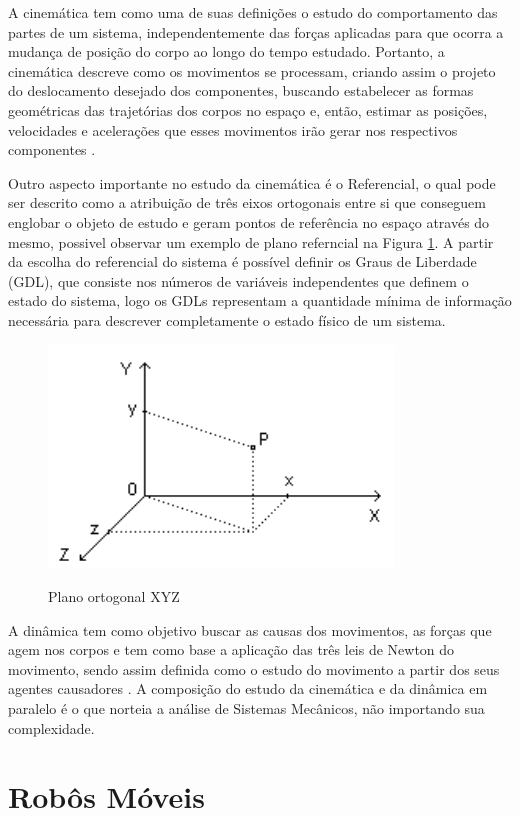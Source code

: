 \documentclass[deposito, acronym, symbols]{fei}
\begin{document}
A cinemática tem como uma de suas definições o estudo do comportamento das partes de um sistema, independentemente das forças aplicadas para que ocorra a mudança de posição do corpo ao longo do tempo estudado. Portanto, a cinemática descreve como os movimentos se processam, criando assim o projeto do deslocamento desejado dos componentes, buscando estabelecer as formas geométricas das trajetórias dos corpos no espaço e, então, estimar as posições, velocidades e acelerações que esses movimentos irão gerar nos respectivos componentes \cite{norton2010cinematica}. 

Outro aspecto importante no estudo da cinemática é o Referencial, o qual pode ser descrito como a atribuição de três eixos ortogonais entre si que conseguem englobar o objeto de estudo e geram pontos de referência no espaço através do mesmo, possivel observar um exemplo de plano referncial na Figura \ref{fig:planoxyz}. A partir da escolha do referencial do sistema é possível definir os Graus de Liberdade (GDL), que consiste nos números de variáveis independentes que definem o estado do sistema, logo os GDLs representam a quantidade mínima de informação necessária para descrever completamente o estado físico de um sistema. 

\begin{figure}[!htb]
    \centering
    \caption{Plano ortogonal XYZ}
    \includegraphics[width=0.5\linewidth]{Imagens/Referencial plano XYZ.png}
    \label{fig:planoxyz}
\end{figure}

A dinâmica tem como objetivo buscar as causas dos movimentos, as forças que agem nos corpos e tem como base a aplicação das três leis de Newton do movimento, sendo assim definida como o estudo do movimento a partir dos seus agentes causadores \cite{cinematica}. A composição do estudo da cinemática e da dinâmica em paralelo é o que norteia a análise de Sistemas Mecânicos, não importando sua complexidade.

\section{Robôs Móveis}
\end{document}
